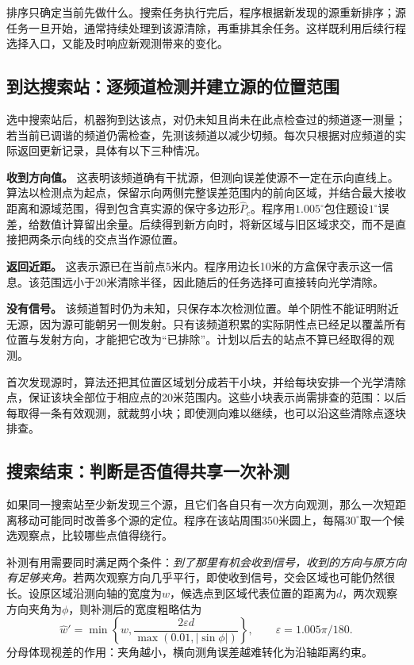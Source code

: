 \documentclass[UTF8,a4paper,12pt,fontset=fandol]{ctexart}
\begin{document}
排序只确定当前先做什么。搜索任务执行完后，程序根据新发现的源重新排序；源任务一旦开始，通常持续处理到该源清除，再重排其余任务。这样既利用后续行程选择入口，又能及时响应新观测带来的变化。

\subsection{到达搜索站：逐频道检测并建立源的位置范围}
选中搜索站后，机器狗到达该点，对仍未知且尚未在此点检查过的频道逐一测量；若当前已调谐的频道仍需检查，先测该频道以减少切频。每次只根据对应频道的实际返回更新记录，具体有以下三种情况。

\textbf{收到方向值。} 这表明该频道确有干扰源，但测向误差使源不一定在示向直线上。算法以检测点为起点，保留示向两侧完整误差范围内的前向区域，并结合最大接收距离和源域范围，得到包含真实源的保守多边形$\widehat P_c$。程序用$1.005^\circ$包住题设$1^\circ$误差，给数值计算留出余量。后续得到新方向时，将新区域与旧区域求交，而不是直接把两条示向线的交点当作源位置。

\textbf{返回近距。} 这表示源已在当前点5米内。程序用边长10米的方盒保守表示这一信息。该范围远小于20米清除半径，因此随后的任务选择可直接转向光学清除。

\textbf{没有信号。} 该频道暂时仍为未知，只保存本次检测位置。单个阴性不能证明附近无源，因为源可能朝另一侧发射。只有该频道积累的实际阴性点已经足以覆盖所有位置与发射方向，才能把它改为“已排除”。计划以后去的站点不算已经取得的观测。

首次发现源时，算法还把其位置区域划分成若干小块，并给每块安排一个光学清除点，保证该块全部位于相应点的20米范围内。这些小块表示尚需排查的范围：以后每取得一条有效观测，就裁剪小块；即使测向难以继续，也可以沿这些清除点逐块排查。

\subsection{搜索结束：判断是否值得共享一次补测}
如果同一搜索站至少新发现三个源，且它们各自只有一次方向观测，那么一次短距离移动可能同时改善多个源的定位。程序在该站周围350米圆上，每隔$30^\circ$取一个候选观察点，比较哪些点值得绕行。

补测有用需要同时满足两个条件：\emph{到了那里有机会收到信号，收到的方向与原方向有足够夹角。}若两次观察方向几乎平行，即使收到信号，交会区域也可能仍然很长。设原区域沿测向轴的宽度为$w$，候选点到区域代表位置的距离为$d$，两次观察方向夹角为$\phi$，则补测后的宽度粗略估为
\begin{equation}
\widehat w'=\min\left\{w,\frac{2\varepsilon d}{\max(0.01,|\sin\phi|)}\right\},
\qquad \varepsilon=1.005\pi/180.
\end{equation}
分母体现视差的作用：夹角越小，横向测角误差越难转化为沿轴距离约束。
\end{document}
